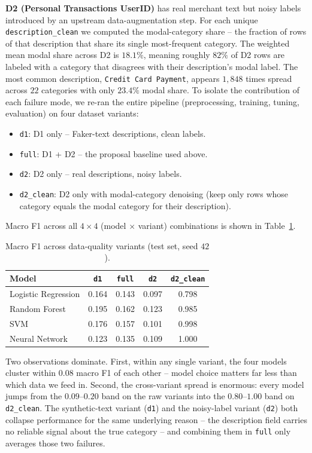 \documentclass[11pt]{article}
\begin{document}
\textbf{D2 (Personal Transactions UserID)} has real merchant text but
noisy labels introduced by an upstream data-augmentation step. For each
unique \texttt{description\_clean}
we computed the modal-category share -- the fraction of rows of that
description that share its single most-frequent category. The weighted
mean modal share across D2 is $18.1\%$, meaning roughly $82\%$ of D2 rows
are labeled with a category that disagrees with their description's modal
label. The most common description, \texttt{Credit Card Payment},
appears $1{,}848$ times spread across $22$ categories with only $23.4\%$
modal share. To isolate the contribution of each failure
mode, we re-ran the entire pipeline (preprocessing, training, tuning,
evaluation) on four dataset variants:

\begin{itemize}[leftmargin=1.5em, itemsep=0pt, topsep=2pt]
\item \texttt{d1}: D1 only -- Faker-text descriptions, clean labels.
\item \texttt{full}: D1 + D2 -- the proposal baseline used above.
\item \texttt{d2}: D2 only -- real descriptions, noisy labels.
\item \texttt{d2\_clean}: D2 only with modal-category denoising (keep only
rows whose category equals the modal category for their description).
\end{itemize}

\noindent Macro F1 across all $4 \times 4$ (model $\times$ variant) combinations
is shown in Table~\ref{tab:cross-variant}.

\begin{table}[!htbp]
\centering
\caption{Macro F1 across data-quality variants (test set, seed $42$).}
\label{tab:cross-variant}
\begin{tabular}{lcccc}
\toprule
Model & \texttt{d1} & \texttt{full} & \texttt{d2} & \texttt{d2\_clean} \\
\midrule
Logistic Regression & 0.164 & 0.143 & 0.097 & 0.798 \\
Random Forest       & 0.195 & 0.162 & 0.123 & 0.985 \\
SVM                 & 0.176 & 0.157 & 0.101 & 0.998 \\
Neural Network      & 0.123 & 0.135 & 0.109 & 1.000 \\
\bottomrule
\end{tabular}
\end{table}

Two observations dominate. First, within any single variant, the four
models cluster within $0.08$ macro F1 of each other -- model choice
matters far less than which data we feed in. Second, the cross-variant
spread is enormous: every model jumps from the $0.09$--$0.20$ band on the
raw variants into the $0.80$--$1.00$ band on \texttt{d2\_clean}. The synthetic-text
variant (\texttt{d1}) and the noisy-label variant (\texttt{d2}) both
collapse performance for the same underlying reason -- the description
field carries no reliable signal about the true category -- and combining
them in \texttt{full} only averages those two failures.
\end{document}
